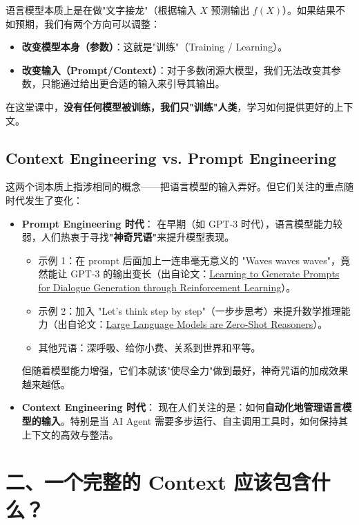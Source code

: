 \documentclass[12pt,a4paper]{article}
\begin{document}
语言模型本质上是在做"文字接龙"（根据输入 $X$ 预测输出 $f(X)$）。如果结果不如预期，我们有两个方向可以调整：
\begin{itemize}[leftmargin=2em]
  \item \textbf{改变模型本身（参数）}：这就是"训练"（Training / Learning）。
  \item \textbf{改变输入（Prompt/Context）}：对于多数闭源大模型，我们无法改变其参数，只能通过给出更合适的输入来引导其输出。
\end{itemize}

在这堂课中，\textbf{没有任何模型被训练，我们只"训练"人类}，学习如何提供更好的上下文。

\subsection{Context Engineering vs. Prompt Engineering}

这两个词本质上指涉相同的概念——把语言模型的输入弄好。但它们关注的重点随时代发生了变化：

\begin{itemize}[leftmargin=2em]
  \item \textbf{Prompt Engineering 时代}：
  在早期（如 GPT-3 时代），语言模型能力较弱，人们热衷于寻找\textbf{"神奇咒语"}来提升模型表现。
  \begin{itemize}
    \item 示例 1：在 prompt 后面加上一连串毫无意义的 "Waves waves waves"，竟然能让 GPT-3 的输出变长（出自论文：\href{https://arxiv.org/abs/2206.03931}{Learning to Generate Prompts for Dialogue Generation through Reinforcement Learning}）。
    \item 示例 2：加入 "Let's think step by step"（一步步思考）来提升数学推理能力（出自论文：\href{https://arxiv.org/abs/2205.11916}{Large Language Models are Zero-Shot Reasoners}）。
    \item 其他咒语：深呼吸、给你小费、关系到世界和平等。
  \end{itemize}
  但随着模型能力增强，它们本就该"使尽全力"做到最好，神奇咒语的加成效果越来越低。

  \item \textbf{Context Engineering 时代}：
  现在人们关注的是：如何\textbf{自动化地管理语言模型的输入}。特别是当 AI Agent 需要多步运行、自主调用工具时，如何保持其上下文的高效与整洁。
\end{itemize}

\section{二、一个完整的 Context 应该包含什么？}
\end{document}
